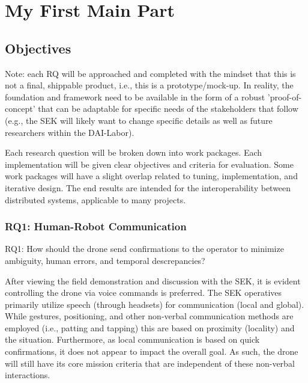\chapter{My First Main Part}
\label{mainone}

\section{Objectives}

Note: each RQ will be approached and completed with the mindset that this is not a final, shippable product, i.e., this is a prototype/mock-up. In reality, the foundation and framework need to be available in the form of a robust 'proof-of-concept' that can be adaptable for specific needs of the stakeholders that follow (e.g., the SEK will likely want to change specific details as well as future researchers within the DAI-Labor). 
\smallskip

Each research question will be broken down into work packages. Each implementation will be given clear objectives and criteria for evaluation. Some work packages will have a slight overlap related to tuning, implementation, and iterative design. The end results are intended for the interoperability between distributed systems, applicable to many projects. 
\smallskip

\subsection{RQ1: Human-Robot Communication}
\noindent RQ1: How should the drone send confirmations to the operator to minimize ambiguity, human errors, and temporal descrepancies?
\smallskip

After viewing the field demonstration and discussion with the SEK, it is evident controlling the drone via voice commands is preferred. The SEK operatives primarily utilize speech (through headsets) for communication (local and global). While gestures, positioning, and other non-verbal communication methods are employed (i.e., patting and tapping) this are based on proximity (locality) and the situation. Furthermore, as local communication is based on quick confirmations, it does not appear to impact the overall goal. As such, the drone will still have its core mission criteria that are independent of these non-verbal interactions. 
\smallskip

